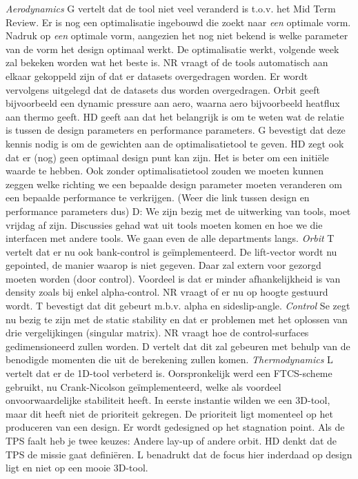 \textit{Aerodynamics}\newline
G vertelt dat de tool niet veel veranderd is t.o.v. het Mid Term Review. Er is nog een optimalisatie ingebouwd die zoekt naar \textit{een} optimale vorm. Nadruk op \textit{een} optimale vorm, aangezien het nog niet bekend is welke parameter van de vorm het design optimaal werkt. De optimalisatie werkt, volgende week zal bekeken worden wat het beste is. NR vraagt of de tools automatisch aan elkaar gekoppeld zijn of dat er datasets overgedragen worden. Er wordt vervolgens uitgelegd dat de datasets dus worden overgedragen. Orbit geeft bijvoorbeeld een dynamic pressure aan aero, waarna aero bijvoorbeeld heatflux aan thermo geeft. HD geeft aan dat het belangrijk is om te weten wat de relatie is tussen de design parameters en performance parameters. G bevestigt dat deze kennis nodig is om de gewichten aan de optimalisatietool te geven. HD zegt ook dat er (nog) geen optimaal design punt kan zijn. Het is beter om een initi\"{e}le waarde te hebben. Ook zonder optimalisatietool zouden we moeten kunnen zeggen welke richting we een bepaalde design parameter moeten veranderen om een bepaalde performance te verkrijgen. (Weer die link tussen design en performance parameters dus)
D: We zijn bezig met de uitwerking van tools, moet vrijdag af zijn. Discussies gehad wat uit tools moeten komen en hoe we die interfacen met andere tools. We gaan even de alle departments langs.
\newline\newline
\textit{Orbit}\newline
T vertelt dat er nu ook bank-control is ge\"{i}mplementeerd. De lift-vector wordt nu gepointed, de manier waarop is niet gegeven. Daar zal extern voor gezorgd moeten worden (door control). Voordeel is dat er minder afhankelijkheid is van density zoals bij enkel alpha-control. NR vraagt of er nu op hoogte gestuurd wordt. T bevestigt dat dit gebeurt m.b.v. alpha en sideslip-angle.
\newline\newline
\textit{Control}\newline
Se zegt nu bezig te zijn met de static stability en dat er problemen met het oplossen van drie vergelijkingen (singular matrix). NR vraagt hoe de control-surfaces gedimensioneerd zullen worden. D vertelt dat dit zal gebeuren met behulp van de benodigde momenten die uit de berekening zullen komen.
\newline\newline
\textit{Thermodynamics}
L vertelt dat er de 1D-tool verbeterd is. Oorspronkelijk werd een FTCS-scheme gebruikt, nu Crank-Nicolson ge\"{i}mplementeerd, welke als voordeel onvoorwaardelijke stabiliteit heeft. In eerste instantie wilden we een 3D-tool, maar dit heeft niet de prioriteit gekregen. De prioriteit ligt momenteel op het produceren van een design. Er wordt gedesigned op het stagnation point. Als de TPS faalt heb je twee keuzes: Andere lay-up of andere orbit. HD denkt dat de TPS de missie gaat defini\"{e}ren. L benadrukt dat de focus hier inderdaad op design ligt en niet op een mooie 3D-tool.
